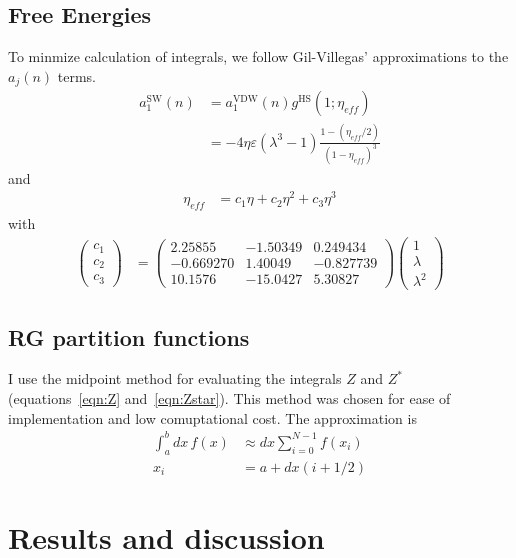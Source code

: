 \documentclass[letterpaper,twocolumn,amsmath,amssymb,prb]{revtex4-1}
\newcommand{\1}{\ensuremath{\textbf{r}_1}}
\newcommand{\2}{\ensuremath{\textbf{r}_2}}
\newcommand{\3}{\ensuremath{\textbf{r}_3}}
\newcommand{\4}{\ensuremath{\textbf{r}_4}}
\begin{document}
\subsection{Free Energies}\label{subsec:free-energies}
To minmize calculation of integrals, we follow Gil-Villegas' approximations to the $a_j(n)$ terms.
\newcommand\eff{\textit{eff}}
\begin{align}
  a_1^\text{SW}(n) &= a_1^\text{VDW}(n)g^\text{HS}(1;\eta_{\eff}) \nonumber \\
  &= -4\eta\varepsilon(\lambda^3 - 1)\frac{1 - \left( \eta_{\eff}/2 \right)}{(1 - \eta_{\eff})^3}
\end{align}
and
\begin{align}
  \eta_{\eff} &= c_1\eta + c_2\eta^2 + c_3\eta^3
\end{align}
with
\begin{align}
  \left( \begin{array}{c}
    c_1 \\
    c_2 \\
    c_3
    \end{array} \right)
  &= \left( \begin{array}{ccc}
    2.25855 & -1.50349 & 0.249434 \\
    -0.669270 & 1.40049 & -0.827739 \\
    10.1576 & -15.0427 & 5.30827
    \end{array} \right)
  \left( \begin{array}{c}
    1 \\
    \lambda \\
    \lambda^2
    \end{array} \right)
\end{align}

\subsection{RG partition functions}\label{subsec:fbar-ubar}
I use the midpoint method for evaluating the integrals $Z$ and
$Z^*$ (equations~\ref{eqn:Z} and~\ref{eqn:Zstar}). This method was
chosen for ease of implementation and low comuptational cost. The approximation is
\begin{align}
  \int_a^b dx\, f(x) &\approx dx\sum_{i=0}^{N-1} f(x_i) \\
  x_i &= a + dx(i+1/2)
\end{align}

\section{Results and discussion}\label{sec:results}
\end{document}
